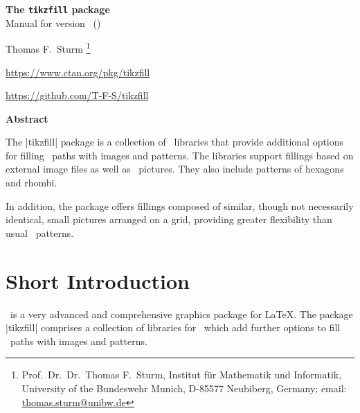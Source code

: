 \documentclass[a4paper,11pt]{article}
\begin{document}
\begin{center}
\begin{tcolorbox}[enhanced,hbox,tikznode,left=8mm,right=8mm,boxrule=0.4pt,
  colback=white,colframe=black!50!yellow,
  drop lifted shadow=black!50!yellow,arc is angular,
  before=\par\vspace*{5mm},after=\par\bigskip]
{\bfseries\LARGE The \texttt{tikzfill} package}\\[3mm]
{\large Manual for version \version\ (\datum)}
\end{tcolorbox}
{\large Thomas F.~Sturm%
  \footnote{Prof.~Dr.~Dr.~Thomas F.~Sturm, Institut f\"{u}r Mathematik und Informatik,
    University of the Bundeswehr Munich, D-85577 Neubiberg, Germany;
     email: \href{mailto:thomas.sturm@unibw.de}{thomas.sturm@unibw.de}}\par\medskip
\normalsize\url{https://www.ctan.org/pkg/tikzfill}\par
\url{https://github.com/T-F-S/tikzfill}
}
\end{center}
\bigskip
\begin{absquote}
  \begin{center}\bfseries Abstract\end{center}
  The |tikzfill| package is a collection of \tikzname\ libraries that provide
  additional options for filling \tikzname\ paths with images and patterns. The
  libraries support fillings based on external image files as well as \tikzname\
  pictures. They also include patterns of hexagons and rhombi.

  In addition, the package offers fillings composed of similar, though not
  necessarily identical, small pictures arranged on a grid, providing greater
  flexibility than usual \tikzname\ patterns.
\end{absquote}

\clearpage
\tableofcontents


\clearpage
\section{Short Introduction}\label{sec:intro}

\tikzname\ is a very advanced and comprehensive graphics package for \LaTeX.
The package |tikzfill| comprises a collection of libraries for \tikzname\, which
add further options to fill \tikzname\ paths with images and patterns.
\end{document}
